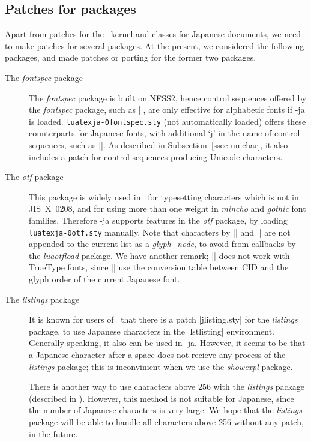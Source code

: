 \documentclass{ajt}
\begin{document}
\subsection{Patches for packages}
Apart from patches for the \LaTeXe~kernel and classes for Japanese
documents, we need to make patches for several packages. At the present,
we considered the following packages, and made patches or porting for
the former two packages.

\begin{description}
\item[The \emph{fontspec} package] The \emph{fontspec} package is built
	   on NFSS2, hence control sequences offered by the
	   \emph{fontspec} package, such as |\setmainfont|, are only
	   effective for alphabetic fonts if \LuaTeX-ja is loaded.
	   \texttt{luatexja-\penalty0fontspec.sty} (not automatically
	   loaded) offers these counterparts for Japanese fonts, with
	   additional `j' in the name of control sequences, such as
	   |\setmainjfont|. As described in
	   Subsection~\ref{ssec-unichar}, it also includes a patch for
	   control sequences producing Unicode characters.

\item[The \emph{otf} package]
This package is widely used in \pTeX\ for typesetting characters which is
not in JIS~X~0208, and for using more than one weight in \emph{mincho}
and \emph{gothic} font families. Therefore \LuaTeX-ja supports features
in the \emph{otf} package, by loading \texttt{luatexja-\penalty0otf.sty}
	   manually. Note that characters by |\UTF{}| and
	   |\CID{}| are not appended to the current list as a
	   \emph{glyph\_node}, to avoid from callbacks by the
	   \emph{luaotfload} package. We have another remark; |\CID|
	   does not work with TrueType fonts, since |\CID| use the
	   conversion table between CID and the glyph order of the
	   current Japanese font.

\item[The \emph{listings} package]
It is known for users of \pTeX\ that there is a patch |jlisting.sty| for
	   the \emph{listings} package, to use Japanese characters in
	   the |lstlisting| environment. Generally speaking, it also can
	   be used in \LuaTeX-ja. However, it seems to be that a
	   Japanese character after a space does not recieve any process
	   of the \emph{listings} package; this is inconvinient when we
	   use the \emph{showexpl} package.

There is another way to use characters above 256 with the
	   \emph{listings} package (described in \cite{apl}). However,
	   this method is not suitable for Japanese, since the number of
	   Japanese characters is very large. We hope that the
	   \emph{listings} package will be able to handle all characters above
	   256 without any patch, in the future.


\end{description}
\end{document}
